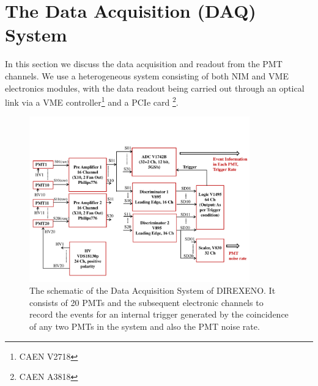 \section{The Data Acquisition (DAQ) System }
\label{sec:DAQ}


In this section we discuss the data acquisition and readout from the PMT 
channels. We use a heterogeneous system consisting of both 
NIM and VME electronics modules, with the data readout being carried out 
through an optical link via a VME controller\footnote{CAEN V2718} and a 
PCIe card \footnote{CAEN A3818}. 

\begin{figure}[h]
   \centering
   \includegraphics[width=0.85\textwidth]{DAQscheme.pdf}
   \caption{The schematic of the Data Acquisition System of DIREXENO. It 
        consists of 20 PMTs and the subsequent electronic channels to record 
        the events for an internal trigger generated by the coincidence of any 
        two PMTs in the system and also the PMT noise rate.}
   \label{Fig:DAQscheme}
\end{figure}

